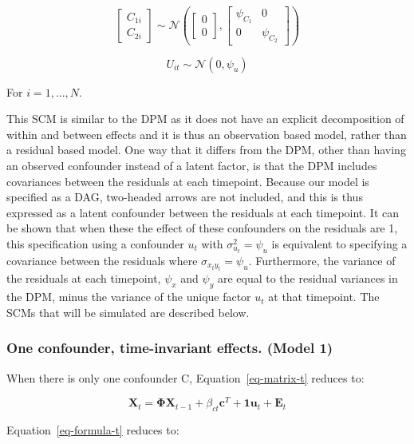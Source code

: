 \documentclass[
]{interact}
\begin{document}
\[
\begin{bmatrix}
C_{1i}\\
C_{2i}
\end{bmatrix} \sim \mathcal{N}\left(\begin{bmatrix} 0\\0 \end{bmatrix}, \begin{bmatrix}\psi_{C_1} & 0 \\0 & \psi_{C_2} \end{bmatrix} \right)
\]

\[
U_{it} \sim \mathcal{N}\left(0, \psi_u\right)
\]

For \(i = 1,...,N\).

This SCM is similar to the DPM as it does not have an explicit
decomposition of within and between effects and it is thus an
observation based model, rather than a residual based model. One way
that it differs from the DPM, other than having an observed confounder
instead of a latent factor, is that the DPM includes covariances between
the residuals at each timepoint. Because our model is specified as a
DAG, two-headed arrows are not included, and this is thus expressed as a
latent confounder between the residuals at each timepoint. It can be
shown that when these the effect of these confounders on the residuals
are 1, this specification using a confounder \(u_t\) with
\(\sigma_{u_t}^2 = \psi_u\) is equivalent to specifying a covariance
between the residuals where \(\sigma_{x_ty_t} = \psi_u\). Furthermore,
the variance of the residuals at each timepoint, \(\psi_x\) and
\(\psi_y\) are equal to the residual variances in the DPM, minus the
variance of the unique factor \(u_t\) at that timepoint. The SCMs that
will be simulated are described below.

\hypertarget{one-confounder-time-invariant-effects.-model-1}{%
\subsubsection{One confounder, time-invariant effects. (Model
1)}\label{one-confounder-time-invariant-effects.-model-1}}

When there is only one confounder C, Equation~\ref{eq-matrix-t} reduces
to:

\[
\textbf{X}_t = \boldsymbol{\Phi}\textbf{X}_{t-1} + \beta_{ct}\textbf{c}^T + \textbf{1}\textbf{u}_t + \textbf{E}_t
\]

Equation~\ref{eq-formula-t} reduces to:
\end{document}
